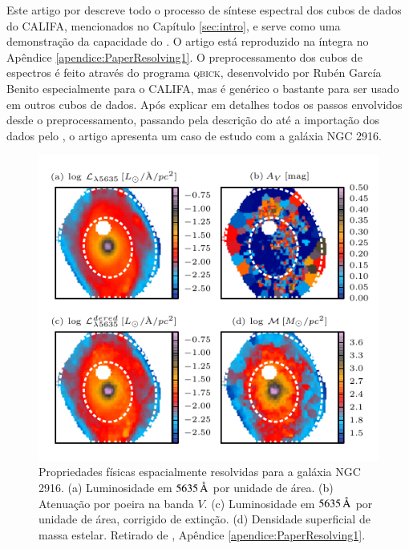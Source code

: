 Este artigo por \citet{CidFernandes2013} descreve todo o processo de síntese
espectral dos cubos de dados do CALIFA, mencionados no Capítulo \ref{sec:intro},
e serve como uma demonstração da capacidade do \pycasso. O artigo está
reproduzido na íntegra no Apêndice \ref{apendice:PaperResolving1}. O
preprocessamento dos cubos de espectros é feito através do programa
\textsc{qbick}, desenvolvido por Rubén García Benito especialmente para o
CALIFA, mas é genérico o bastante para ser usado em outros cubos de dados. Após
explicar em detalhes todos os passos envolvidos desde o preprocessamento,
passando pela descrição do \starlight até a importação dos dados pelo \pycasso,
o artigo apresenta um caso de estudo com a galáxia NGC 2916.

\begin{figure}
	\includegraphics{figuras/L-M-AV-K0277}
	\caption[Propriedades físicas espacialmente resolvidas para a galáxia NGC
	2916] {Propriedades físicas espacialmente resolvidas para a galáxia NGC 2916. (a)
	Luminosidade em $5635\,\text{\normalfont\AA}$ por unidade de área. (b) Atenuação por
	poeira na banda $V$. (c) Luminosidade em $5635\,\text{\normalfont\AA}$ por unidade de área,
	corrigido de extinção. (d) Densidade superficial de massa estelar. Retirado de
	\citet[figura 4]{CidFernandes2013}, Apêndice \ref{apendice:PaperResolving1}.}
	\label{fig:LMAVMap}
\end{figure}


